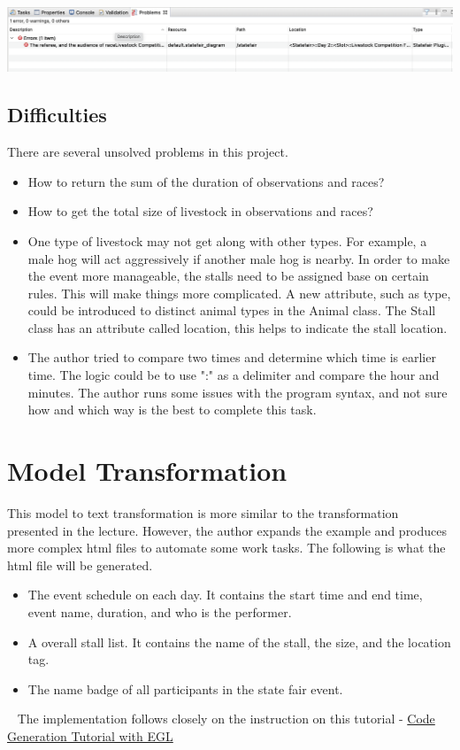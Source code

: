 \documentclass[12pt]{article}
\begin{document}
\includegraphics[scale = 0.4]{img/graph-editor-error2}

\subsection{Difficulties}
There are several unsolved problems in this project.

\begin{itemize}
    \item How to return the sum of the duration of observations and races? 
    \item How to get the total size of livestock in observations and races?
    \item One type of livestock may not get along with other types. For example, a male hog will 
    act aggressively if another male hog is nearby. In order to make the event more manageable, 
    the stalls need to be assigned base on certain rules. This will make things more complicated. 
    A new attribute, such as type, could be introduced to distinct animal types in the Animal 
    class. The Stall class has an attribute called location, this helps to indicate the stall location.
    \item The author tried to compare two times and determine which time is earlier time. The logic 
    could be to use ":" as a delimiter and compare the hour and minutes. The author runs some issues 
    with the program syntax, and not sure how and which way is the best to complete this task.
\end{itemize}

\pagebreak
\section{Model Transformation}
This model to text transformation is more similar to the transformation presented in the lecture. However, the author expands the example 
and produces more complex html files to automate some work tasks. The following is what the html file will be generated.
\begin{itemize}
    \item The event schedule on each day. It contains the start time and end time, event name, duration, and who is the performer.
    \item A overall stall list. It contains the name of the stall, the size, and the location tag.
    \item The name badge of all participants in the state fair event.
\end{itemize}
~\newline
The implementation follows closely on the instruction on this tutorial - 
\href{https://www.eclipse.org/epsilon/doc/articles/code-generation-tutorial-egl/}{Code Generation Tutorial with EGL}
\end{document}

